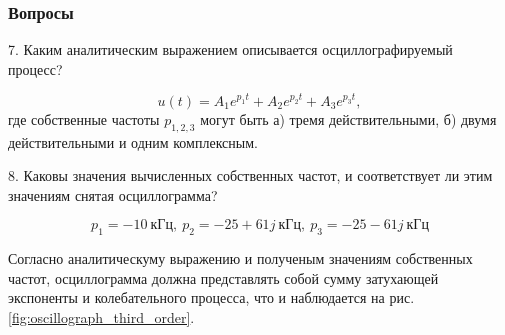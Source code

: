 \subsubsection{Вопросы}

7. Каким аналитическим выражением описывается осциллографируемый
процесс?

\[
    u(t) = A_1 e^{p_1 t} + A_2 e^{p_2 t} + A_3 e^{p_3 t},
\]
где собственные частоты $p_{1,2,3}$ могут быть а) тремя действительными,
б) двумя действительными и одним комплексным.

8. Каковы значения вычисленных собственных частот,
и соответствует ли этим значениям снятая осциллограмма?

\[
    p_1 = -10\ \text{кГц},\ p_2 = -25 + 61j\ \text{кГц},\
    p_3 = -25 - 61j\ \text{кГц}
\]

Согласно аналитическуму выражению и полученым значениям собственных
частот, осциллограмма должна представлять собой сумму затухающей экспоненты и колебательного процесса,
что и наблюдается на рис. \ref*{fig:oscillograph_third_order}.
